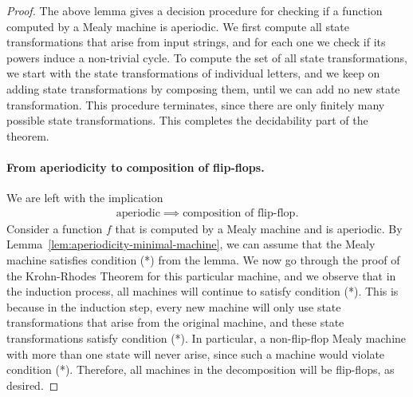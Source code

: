 \begin{proof}
    The above lemma gives a decision procedure for checking if a function computed by a Mealy machine is aperiodic. We first compute all state transformations that arise from input strings, and for each one we check if its powers induce a non-trivial cycle. To compute the set of all state transformations, we start with the state transformations of individual letters, and we keep on adding state transformations by composing them, until we can add no new state transformation. This procedure terminates, since there are only finitely many possible state transformations.   This completes the decidability part of the theorem.

    \paragraph*{From aperiodicity to composition of flip-flops.} We are left with the implication
\begin{align*}\text{aperiodic} \implies \text{composition of flip-flop}.
\end{align*}
Consider a function $f$ that is computed by a Mealy machine and is aperiodic. By Lemma~\ref{lem:aperiodicity-minimal-machine}, we can assume that the Mealy machine satisfies condition (*) from the lemma. We now go through the proof of the Krohn-Rhodes Theorem for this particular machine, and we observe that in the induction process, all machines will continue to satisfy condition (*). This is because in the induction step, every new machine will only use state transformations that arise from the original machine, and these state transformations satisfy condition (*).  In particular, a non-flip-flop Mealy machine with more than one state will never arise, since such a machine would violate condition (*). Therefore, all machines in the decomposition will be flip-flops, as desired.

\end{proof}


\exerciseheader

